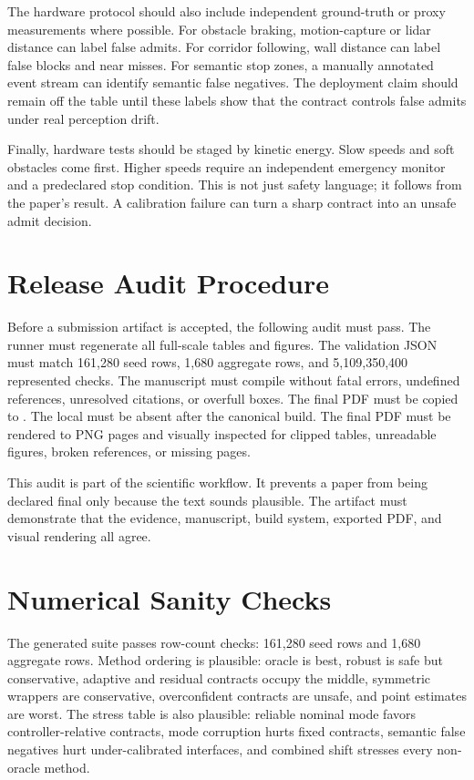 \documentclass{article}
\newcommand{\fullscale}{5,109,350,400}
\newcommand{\seedrows}{161,280}
\newcommand{\aggrows}{1,680}
\begin{document}
The hardware protocol should also include independent ground-truth or proxy measurements where possible. For obstacle braking, motion-capture or lidar distance can label false admits. For corridor following, wall distance can label false blocks and near misses. For semantic stop zones, a manually annotated event stream can identify semantic false negatives. The deployment claim should remain off the table until these labels show that the contract controls false admits under real perception drift.

Finally, hardware tests should be staged by kinetic energy. Slow speeds and soft obstacles come first. Higher speeds require an independent emergency monitor and a predeclared stop condition. This is not just safety language; it follows from the paper's result. A calibration failure can turn a sharp contract into an unsafe admit decision.

\section{Release Audit Procedure}

Before a submission artifact is accepted, the following audit must pass. The runner must regenerate all full-scale tables and figures. The validation JSON must match \seedrows{} seed rows, \aggrows{} aggregate rows, and \fullscale{} represented checks. The manuscript must compile without fatal errors, undefined references, unresolved citations, or overfull boxes. The final PDF must be copied to . The local  must be absent after the canonical build. The final PDF must be rendered to PNG pages and visually inspected for clipped tables, unreadable figures, broken references, or missing pages.

This audit is part of the scientific workflow. It prevents a paper from being declared final only because the text sounds plausible. The artifact must demonstrate that the evidence, manuscript, build system, exported PDF, and visual rendering all agree.

\section{Numerical Sanity Checks}

The generated suite passes row-count checks: \seedrows{} seed rows and \aggrows{} aggregate rows. Method ordering is plausible: oracle is best, robust is safe but conservative, adaptive and residual contracts occupy the middle, symmetric wrappers are conservative, overconfident contracts are unsafe, and point estimates are worst. The stress table is also plausible: reliable nominal mode favors controller-relative contracts, mode corruption hurts fixed contracts, semantic false negatives hurt under-calibrated interfaces, and combined shift stresses every non-oracle method.
\end{document}
